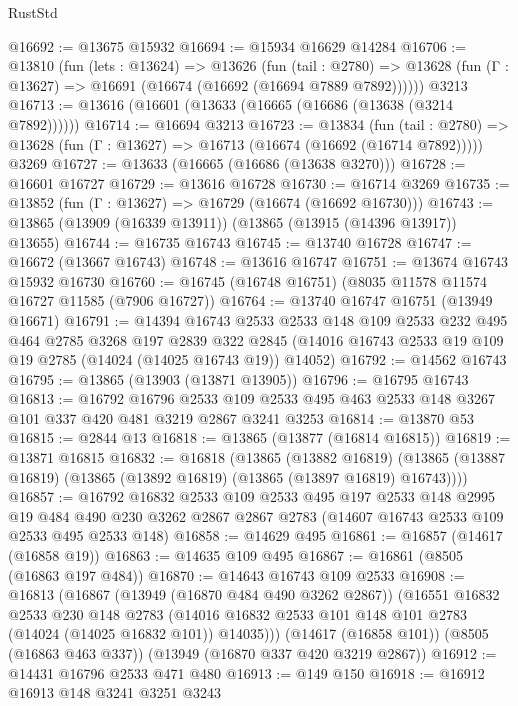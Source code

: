 \begin{lexlean}{RustStd}
\begin{coremodule}
@16692 := @13675 @15932
@16694 := @15934 @16629 @14284
@16706 := @13810
    (fun (lets : @13624) =>
    @13626
      (fun (tail : @2780) =>
      @13628 (fun (Γ : @13627) => @16691 (@16674 (@16692 (@16694 @7889 @7892))))))
    @3213
@16713 := @13616 (@16601 (@13633 (@16665 (@16686 (@13638 (@3214 @7892))))))
@16714 := @16694 @3213
@16723 := @13834
    (fun (tail : @2780) => @13628 (fun (Γ : @13627) => @16713 (@16674 (@16692 (@16714 @7892)))))
    @3269
@16727 := @13633 (@16665 (@16686 (@13638 @3270)))
@16728 := @16601 @16727
@16729 := @13616 @16728
@16730 := @16714 @3269
@16735 := @13852 (fun (Γ : @13627) => @16729 (@16674 (@16692 @16730)))
@16743 := @13865 (@13909 (@16339 @13911)) (@13865 (@13915 (@14396 @13917)) @13655)
@16744 := @16735 @16743
@16745 := @13740 @16728
@16747 := @16672 (@13667 @16743)
@16748 := @13616 @16747
@16751 := @13674 @16743 @15932 @16730
@16760 := @16745 (@16748 @16751) (@8035 @11578 @11574 @16727 @11585 (@7906 @16727))
@16764 := @13740 @16747 @16751 (@13949 @16671)
@16791 := @14394
    @16743
    @2533
    @2533
    @148
    @109
    @2533
    @232
    @495
    @464
    @2785
    @3268
    @197
    @2839
    @322
    @2845
    (@14016 @16743 @2533 @19 @109 @19 @2785 (@14024 (@14025 @16743 @19)) @14052)
@16792 := @14562 @16743
@16795 := @13865 (@13903 (@13871 @13905))
@16796 := @16795 @16743
@16813 := @16792
    @16796
    @2533
    @109
    @2533
    @495
    @463
    @2533
    @148
    @3267
    @101
    @337
    @420
    @481
    @3219
    @2867
    @3241
    @3253
@16814 := @13870 @53
@16815 := @2844 @13
@16818 := @13865 (@13877 (@16814 @16815))
@16819 := @13871 @16815
@16832 := @16818
    (@13865
      (@13882 @16819)
      (@13865 (@13887 @16819) (@13865 (@13892 @16819) (@13865 (@13897 @16819) @16743))))
@16857 := @16792
    @16832
    @2533
    @109
    @2533
    @495
    @197
    @2533
    @148
    @2995
    @19
    @484
    @490
    @230
    @3262
    @2867
    @2867
    @2783
    (@14607 @16743 @2533 @109 @2533 @495 @2533 @148)
@16858 := @14629 @495
@16861 := @16857 (@14617 (@16858 @19))
@16863 := @14635 @109 @495
@16867 := @16861 (@8505 (@16863 @197 @484))
@16870 := @14643 @16743 @109 @2533
@16908 := @16813
    (@16867
      (@13949 (@16870 @484 @490 @3262 @2867))
      (@16551
        @16832
        @2533
        @230
        @148
        @2783
        (@14016 @16832 @2533 @101 @148 @101 @2783 (@14024 (@14025 @16832 @101)) @14035)))
    (@14617 (@16858 @101))
    (@8505 (@16863 @463 @337))
    (@13949 (@16870 @337 @420 @3219 @2867))
@16912 := @14431 @16796 @2533 @471 @480
@16913 := @149 @150
@16918 := @16912 @16913 @148 @3241 @3251 @3243

\end{coremodule}
\end{lexlean}
